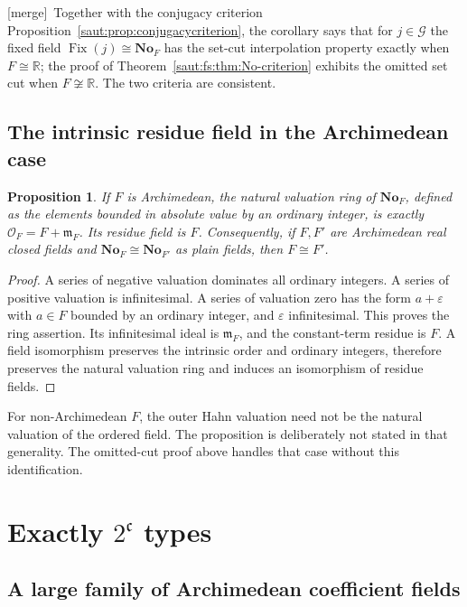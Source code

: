 \documentclass[11pt]{article}
\newtheorem{proposition}[theorem]{Proposition}
\theoremstyle{definition}
\theoremstyle{remark}
\newcommand{\No}{\mathbf{No}}
\newcommand{\R}{\mathbb R}
\newcommand{\OO}{\mathcal O}
\newcommand{\mm}{\mathfrak m}
\newcommand{\Fix}{\operatorname{Fix}}
\newcommand{\mergetag}{\textup{[merge]}}
\numberwithin{equation}{section}
\begin{document}
\mergetag\ Together with the conjugacy criterion
Proposition~\ref{saut:prop:conjugacycriterion}, the corollary says that for
$j\in\mathcal G$ the fixed field $\Fix(j)\cong\No_F$ has the set-cut interpolation
property exactly when $F\cong\R$; the proof of
Theorem~\ref{saut:fs:thm:No-criterion} exhibits the omitted set cut when
$F\not\cong\R$. The two criteria are consistent.

\subsection{The intrinsic residue field in the Archimedean case}

\begin{proposition}\label{saut:fs:prop:residue}
If $F$ is Archimedean, the natural valuation ring of $\No_F$, defined as the elements
bounded in absolute value by an ordinary integer, is exactly $\OO_F=F+\mm_F$. Its
residue field is $F$. Consequently, if $F,F'$ are Archimedean real closed fields and
$\No_F\cong\No_{F'}$ as plain fields, then $F\cong F'$.
\end{proposition}
\begin{proof}
A series of negative valuation dominates all ordinary integers. A series of positive
valuation is infinitesimal. A series of valuation zero has the form $a+\varepsilon$
with $a\in F$ bounded by an ordinary integer, and $\varepsilon$ infinitesimal. This
proves the ring assertion. Its infinitesimal ideal is $\mm_F$, and the constant-term
residue is $F$. A field isomorphism preserves the intrinsic order and ordinary
integers, therefore preserves the natural valuation ring and induces an isomorphism
of residue fields.
\end{proof}

For non-Archimedean $F$, the outer Hahn valuation need not be the natural valuation
of the ordered field. The proposition is deliberately not stated in that generality.
The omitted-cut proof above handles that case without this identification.

\section{Exactly \texorpdfstring{$2^{\mathfrak c}$}{2 to the continuum} types}\label{saut:fs:sec:count}

\subsection{A large family of Archimedean coefficient fields}
\end{document}
